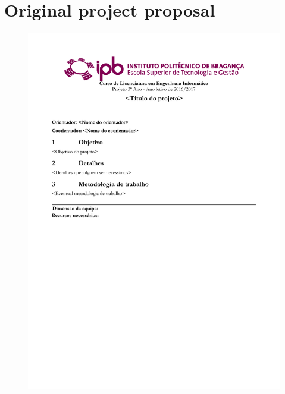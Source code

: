 \chapter{Original project proposal}
\label{apendice1}

\begin{figure}
\hspace{-12ex}
\includegraphics{etc/PropostaProjeto.pdf}
\end{figure}